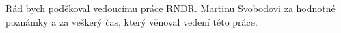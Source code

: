 
\noindent
Rád bych poděkoval vedoucímu práce RNDR. Martinu Svobodovi za hodnotné poznámky a za veškerý čas, který věnoval vedení této práce.
